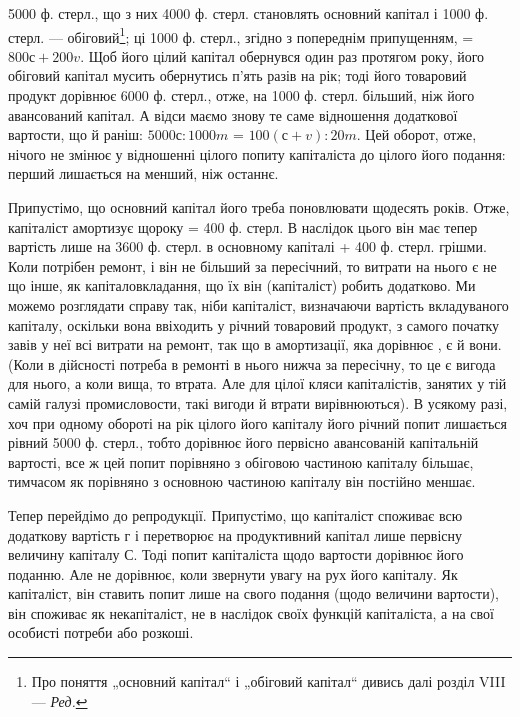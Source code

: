 \parcont{}  %
5000 ф. стерл., що з них 4000 ф. стерл. становлять основний капітал і
1000 ф. стерл. — обіговий\footnote*{
Про поняття „основний капітал“ і „обіговий капітал“ дивись далі розділ
VIII — \emph{Ред.}
}; ці 1000 ф. стерл., згідно з попереднім
припущенням, = $800с + 200v$. Щоб його цілий капітал обернувся
один раз протягом року, його обіговий капітал мусить обернутись п’ять
разів на рік; тоді його товаровий продукт дорівнює 6000 ф. стерл.,
отже, на 1000 ф. стерл. більший, ніж його авансований капітал. А відси
маємо знову те саме відношення додаткової вартости, що й раніш:
$5000с: 1000m$ = $100 (с + v): 20m$. Цей оборот, отже, нічого не
змінює у відношенні цілого попиту капіталіста до цілого його подання:
перший лишається на  менший, ніж останнє.

Припустімо, що основний капітал його треба поновлювати щодесять
років. Отже, капіталіст амортизує щороку  = 400 ф. стерл. В наслідок
цього він має тепер вартість лише на 3600 ф. стерл. в основному капіталі
+ 400 ф. стерл. грішми. Коли потрібен ремонт, і він не більший за
пересічний, то витрати на нього є не що інше, як капіталовкладання, що
їх він (капіталіст) робить додатково. Ми можемо розглядати справу так,
ніби капіталіст, визначаючи вартість вкладуваного капіталу, оскільки
вона ввіходить у річний товаровий продукт, з самого початку завів у
неї всі витрати на ремонт, так що в амортизації, яка дорівнює ,
є й вони. (Коли в дійсності потреба в ремонті в нього нижча
за пересічну, то це є вигода для нього, а коли вища, то втрата. Але
для цілої кляси капіталістів, занятих у тій самій галузі промисловости,
такі вигоди й втрати вирівнюються). В усякому разі, хоч при одному
обороті на рік цілого його капіталу його річний попит лишається рівний
5000 ф. стерл., тобто дорівнює його первісно авансованій капітальній
вартості, все ж цей попит порівняно з обіговою частиною капіталу
більшає, тимчасом як порівняно з основною частиною капіталу він постійно
меншає.

Тепер перейдімо до репродукції. Припустімо, що капіталіст споживає
всю додаткову вартість $г$ і перетворює на продуктивний капітал лише
первісну величину капіталу С. Тоді попит капіталіста щодо вартости
дорівнює його поданню. Але не дорівнює, коли звернути увагу на рух
його капіталу. Як капіталіст, він ставить попит лише на  свого подання
(щодо величини вартости),  він споживає як некапіталіст, не
в наслідок своїх функцій капіталіста, а на свої особисті потреби або
розкоші.

